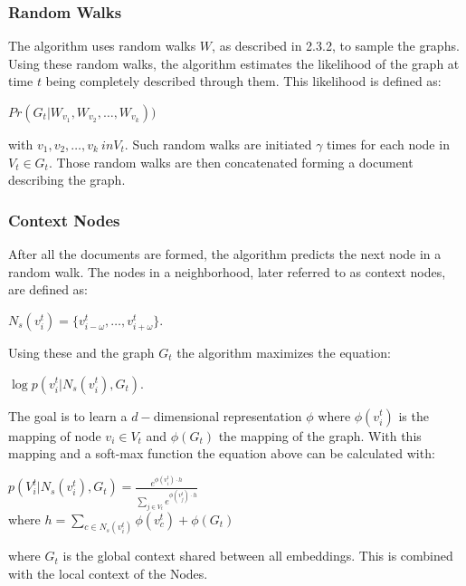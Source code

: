\documentclass[sigconf]{acmart}
\begin{document}
\subsubsection{Random Walks}
The algorithm uses random walks \(W\), as described in 2.3.2, to sample the graphs. Using these random walks, the algorithm estimates the likelihood of the graph
at time \(t\) being completely described through them. This likelihood is defined as:
\begin{center}
  \(Pr(G_t|W_{v_1}, W_{v_2},\ldots, W_{v_k}))\)
\end{center}
with \(v_1, v_2, \ldots, v_k \ in V_t\).
Such random walks are initiated \(\gamma\) times for each node in \(V_t \in G_t\).
Those random walks are then concatenated forming a document describing the graph.
\subsubsection{Context Nodes}
After all the documents are formed, the algorithm predicts the next node in a random walk. 
The nodes in a neighborhood, later referred to as context nodes, are defined as: 
\begin{center}
  \(N_s(v_i^t)=\{v_{i-\omega}^t, \ldots, v_{i+\omega}^t\}\).
\end{center}
Using these and the graph \(G_t\) the algorithm maximizes the equation: 
\begin{center}
  \(\log{p(v_i^t | N_s(v_i^t), G_t)}\).
\end{center}
The goal is to learn a \(d-\)dimensional representation \(\phi\) where \(\phi(v_i^t)\) is the mapping of node
\(v_i \in V_t\) and \(\phi(G_t)\) the mapping of the graph. With this mapping and a soft-max function the equation above can be calculated with: 
\begin{center}
  \(p(V_i^t|N_s(v_i^t), G_t) = \frac{e^{\phi(v_i^t) \cdot h}}{\sum\limits_{j \in V_t} e^{\phi(v_j^t) \cdot h}}   \)\\
  where \(h=\sum\limits_{c \in N_s(v_i^t)} \phi(v_c^t) + \phi(G_t)\)
\end{center}
where \(G_t\) is the global context shared between all embeddings. This is combined with the local context of the Nodes.
\end{document}
